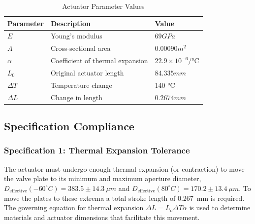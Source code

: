 \documentclass[12pt, letterpaper]{report}%
\newcounter{mycounter}           %
\newcounter{sub}[mycounter]      %
\newcommand{\degC}{^{\circ}C}    %
\newcommand{\coldBoundary}{D_{\text{effective}}(-60\degC) = 383.5 \pm 14.3\ \mu m}
\newcommand{\hotBoundary}{D_{\text{effective}}(80\degC) = 170.2 \pm 13.4\ \mu m}
\newcommand{\specStroke}{0.267} %
\newcommand{\specActuatorCTE}{22.9 \times 10^{-6} \si{\per\celsius}} %
\newcommand{\specYoungMActuator}{69 GPa}
\newcommand{\specCrossSectArea}{0.00090 m^2}
\newcommand{\specOrigActuatorLength}{84.335 mm}
\newcommand{\specTempChange}{140 \si{\celsius}}
\newcommand{\specLengthChange}{0.2674 mm}
\begin{document}
        \begin{table}[H]
            \centering
            \caption{Actuator Parameter Values}
            \label{tab:actuator_parameters}
            \begin{tabularx}{\textwidth}{l X l}
                \toprule
                \textbf{Parameter} & \textbf{Description} & \textbf{Value} \\
                \midrule
                $E$ &
                Young's modulus &
                $\specYoungMActuator$
                \\\addlinespace
                $A$ &
                Cross-sectional area &
                $\specCrossSectArea$
                \\\addlinespace
                $\alpha$ &
                Coefficient of thermal expansion &
               $ \specActuatorCTE$
                \\\addlinespace
                $L_0$ &
                Original actuator length &
                $\specOrigActuatorLength$
                \\\addlinespace
                $\Delta T$ &
                Temperature change &
                \specTempChange
                \\\addlinespace
                $\Delta L$ &
                Change in length &
                $\specLengthChange$
                \\\bottomrule
            \end{tabularx}
        \end{table}

        \subsection{Specification Compliance}
    \subsubsection{Specification 1: Thermal Expansion Tolerance}
        \label{subsec:act_spec_1}

            The actuator must undergo enough thermal expansion (or contraction) to move the valve plate
            to its minimum and maximum aperture diameter, $\coldBoundary$ and $\hotBoundary$. To move the plates
            to these extrema a total stroke length of \specStroke\ mm is required. The governing equation
            for thermal expansion $\Delta L = L_o\Delta T\alpha $ is used to determine materials and actuator
            dimensions that facilitate this movement. 
\end{document}
